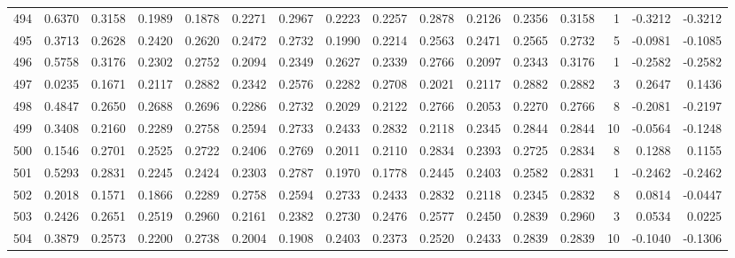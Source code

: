 \begin{tabular}{lrrrrrrrrrrrrrrr}
494 &      0.6370 &  0.3158 &  0.1989 &  0.1878 &  0.2271 &  0.2967 &  0.2223 &  0.2257 &  0.2878 &  0.2126 &   0.2356 &     0.3158 &      1 &                   -0.3212 &                    -0.3212 \\
495 &      0.3713 &  0.2628 &  0.2420 &  0.2620 &  0.2472 &  0.2732 &  0.1990 &  0.2214 &  0.2563 &  0.2471 &   0.2565 &     0.2732 &      5 &                   -0.0981 &                    -0.1085 \\
496 &      0.5758 &  0.3176 &  0.2302 &  0.2752 &  0.2094 &  0.2349 &  0.2627 &  0.2339 &  0.2766 &  0.2097 &   0.2343 &     0.3176 &      1 &                   -0.2582 &                    -0.2582 \\
497 &      0.0235 &  0.1671 &  0.2117 &  0.2882 &  0.2342 &  0.2576 &  0.2282 &  0.2708 &  0.2021 &  0.2117 &   0.2882 &     0.2882 &      3 &                    0.2647 &                     0.1436 \\
498 &      0.4847 &  0.2650 &  0.2688 &  0.2696 &  0.2286 &  0.2732 &  0.2029 &  0.2122 &  0.2766 &  0.2053 &   0.2270 &     0.2766 &      8 &                   -0.2081 &                    -0.2197 \\
499 &      0.3408 &  0.2160 &  0.2289 &  0.2758 &  0.2594 &  0.2733 &  0.2433 &  0.2832 &  0.2118 &  0.2345 &   0.2844 &     0.2844 &     10 &                   -0.0564 &                    -0.1248 \\
500 &      0.1546 &  0.2701 &  0.2525 &  0.2722 &  0.2406 &  0.2769 &  0.2011 &  0.2110 &  0.2834 &  0.2393 &   0.2725 &     0.2834 &      8 &                    0.1288 &                     0.1155 \\
501 &      0.5293 &  0.2831 &  0.2245 &  0.2424 &  0.2303 &  0.2787 &  0.1970 &  0.1778 &  0.2445 &  0.2403 &   0.2582 &     0.2831 &      1 &                   -0.2462 &                    -0.2462 \\
502 &      0.2018 &  0.1571 &  0.1866 &  0.2289 &  0.2758 &  0.2594 &  0.2733 &  0.2433 &  0.2832 &  0.2118 &   0.2345 &     0.2832 &      8 &                    0.0814 &                    -0.0447 \\
503 &      0.2426 &  0.2651 &  0.2519 &  0.2960 &  0.2161 &  0.2382 &  0.2730 &  0.2476 &  0.2577 &  0.2450 &   0.2839 &     0.2960 &      3 &                    0.0534 &                     0.0225 \\
504 &      0.3879 &  0.2573 &  0.2200 &  0.2738 &  0.2004 &  0.1908 &  0.2403 &  0.2373 &  0.2520 &  0.2433 &   0.2839 &     0.2839 &     10 &                   -0.1040 &                    -0.1306 \\

\end{tabular}
